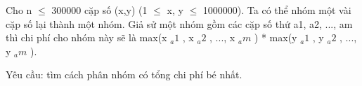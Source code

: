Cho n $\le$ 300000 cặp số (x,y) (1 $\le$ x, y $\le$ 1000000). Ta có thể nhóm một vài cặp số lại thành một nhóm. Giả sử một nhóm gồm các cặp số thứ a1, a2, ..., am thì chi phí cho nhóm này sẽ là max(x   $_    a1   $   , x   $_    a2   $   , ..., x   $_    am   $   ) * max(y   $_    a1   $   , y   $_    a2   $   , ..., y   $_    am   $   ).  

   Yêu cầu: tìm cách phân nhóm có tổng chi phí bé nhất.  

\